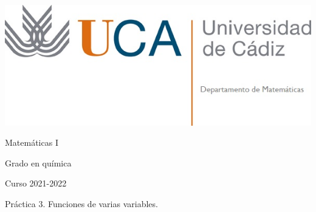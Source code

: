 \documentclass{article}
\title{}
\author{}
\date{}
\begin{document}
\begin{minipage}{.4\textwidth}
 \includegraphics[width=\linewidth]{uca.jpg}
\end{minipage}
%
\begin{minipage}{.6\textwidth}
 \begin{flushright}
  {\Large Matemáticas I}

  \medskip
  {\large Grado en química}

  \medskip
  Curso 2021-2022
 \end{flushright}
\end{minipage}

{\large Práctica 3. Funciones de varias variables.}

\vspace{-15pt}
\hrulefill


\end{document}

